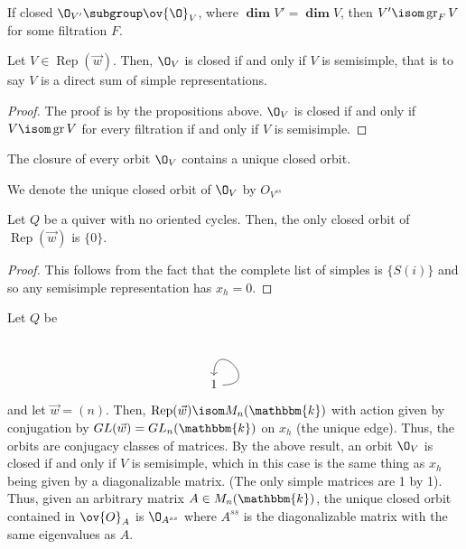 \documentclass[11pt,leqno,oneside]{amsbook}
\numberwithin{thm}{section}
\newcommand{\bbk}{\mathbbm{k}} %
\newcommand{\Rep}{\operatorname{Rep}} %
\renewcommand{\Q}{Q} %
\newcommand{\grdim}{\boldsymbol{\dim}} %
\newcommand{\gr}{\operatorname{gr}} %
\begin{document}
\begin{prop}
  If closed \(\O_{V'} \subgroup \ov{\O}_V\), where \(\grdim V' = \grdim V\),
  then \(V' \isom \gr_F V\) for some filtration \(F\). 
\end{prop}
\begin{prop}
  Let \(V \in \Rep(\vec{w})\). Then, \(\O_V\) is closed if and only if
  \(V\) is semisimple, that is to say \(V\) is a direct sum of simple
  representations.
\end{prop}
\begin{proof}
  The proof is by the propositions above. \(\O_V\) is closed if and
  only if \(V \isom \gr V\) for every filtration if and only if \(V\)
  is semisimple. %
\end{proof}
\begin{cor}
  The closure of every orbit \(\O_V\) contains a unique closed orbit.
\end{cor}
\begin{defn}
  We denote the unique closed orbit of \(\O_V\) by \(O_{V^{ss}}\)
\end{defn}
\begin{cor}
  Let \(\Q\) be a quiver with no oriented cycles. Then, the only
  closed orbit of \(\Rep(\vec{w})\) is \(\{0\}\). 
\end{cor}
\begin{proof}
  This follows from the fact that the complete list of simples is
  \(\{S(i)\}\) and so any semisimple representation has \(x_h = 0\). 
\end{proof}
\begin{example}
  Let \(\Q\) be \[
    \begin{tikzcd}
      1 \arrow[out=0,in=90,loop]
    \end{tikzcd}
  \]
  and let \(\vec{w} = (n)\). Then, \(\Rep(\vec{w}) \isom M_n(\bbk)\)
  with action given by conjugation by \(GL(\vec{w}) = GL_n(\bbk)\) on
  \(x_h\) (the unique edge). Thus, the orbits are conjugacy classes
  of matrices. By the above result, an orbit \(\O_V\) is closed if and
  only if \(V\) is semisimple, which in this case is the same thing as
  \(x_h\) being given by a diagonalizable matrix. (The only simple matrices
  are 1 by 1). Thus, given an arbitrary matrix \(A \in M_n(\bbk)\),
  the unique closed orbit contained in \(\ov{O}_A\) is \(\O_{A^{ss}}\)
  where \(A^{ss}\) is the diagonalizable matrix with the same
  eigenvalues as \(A\). 
\end{example}
\end{document}
